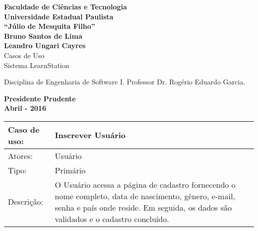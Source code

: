 \documentclass[12pt,a4paper,onecolumn,titlepage]{article}
\begin{document}

\begin{titlepage} %
	
	\vfill
	\begin{center}
	
		{\large \textbf{Faculdade de Ciências e Tecnologia\\Universidade Estadual Paulista\\``Júlio de Mesquita Filho''}} \\[3cm]
		{\large \textbf{Bruno Santos de Lima}}\\
		{\large \textbf{Leandro Ungari Cayres}}\\[4cm]
		{\Large Casos de Uso}\\
		{\Large Sistema LearnStation}\\[4cm]

	\hspace{.45\textwidth} %
	\begin{minipage}{.5\textwidth}
		\large Disciplina de Engenharia de Software I. Professor Dr. Rogério Eduardo Garcia.\\[0.5cm]
	\end{minipage}

	\vfill
	\vspace{1.5cm}
	
	\large \textbf{Presidente Prudente\\}
	\large \textbf{Abril - 2016}
	
	\end{center}
	
\end{titlepage}

\renewcommand{\baselinestretch}{1.5}

\begin{table}[h!]
\begin{center}
\begin{tabular}{p{2.5cm} p{9.5cm}}
Caso de uso: & \textbf{Inscrever Usuário} \\ \hline
Atores: & Usuário \\ \hline
Tipo: & Primário \\ \hline
Descrição: & O Usuário acessa a página de cadastro fornecendo o nome completo, data de nascimento, gênero, e-mail, senha e país onde reside. Em seguida, os dados são validados e o cadastro concluído.
\end{tabular}
\end{center}
\end{table}
\end{document}
